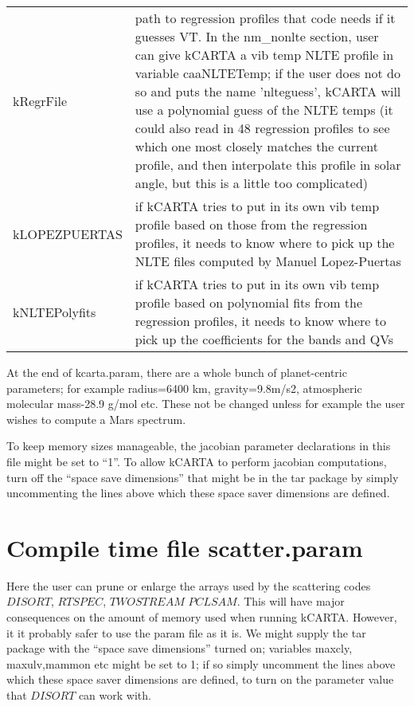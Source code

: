 \documentclass[12pt]{article}
\newcommand{\kc}{\textsf{kCARTA}\xspace}
\newlength{\colwidth}
\begin{document}
\begin{longtable}{|l|p{\colwidth}|}
kRegrFile & path to regression profiles that code needs if it guesses VT.
            In the nm\_nonlte section, user can give kCARTA a vib temp NLTE
            profile in variable caaNLTETemp; if the user does not do so and
            puts the name 'nlteguess', kCARTA will use a polynomial guess
            of the NLTE temps (it could also read in 48 regression profiles 
            to see which one most closely matches the current profile, and 
            then interpolate this profile in solar angle, but this is 
            a little too complicated)\\
kLOPEZPUERTAS & if kCARTA tries to put in its own vib temp profile based on 
               those from the regression profiles, it needs to know where to 
               pick up the NLTE files computed by Manuel Lopez-Puertas\\
kNLTEPolyfits & if kCARTA tries to put in its own vib temp profile based on 
               polynomial fits from the regression profiles, it needs to know 
               where to pick up the coefficients for the bands and QVs \\
               \hline
\end{longtable}

At the end of kcarta.param, there are a whole bunch of planet-centric parameters;
for example radius=6400 km, gravity=9.8m/s2, atmospheric molecular mass-28.9 g/mol etc. 
These not be changed unless for example the user wishes to compute a Mars spectrum.

To keep memory sizes manageable, the jacobian parameter declarations in this
file might be set to ``1''. To allow \kc to perform jacobian computations, 
turn off the ``space save dimensions'' that might be in the tar package by  
simply uncommenting the lines above which these space saver dimensions are 
defined.

\section{Compile time file {\sf scatter.param}}
Here the user can prune or enlarge the arrays used by the scattering codes 
$DISORT$, $RTSPEC$, $TWOSTREAM$ $PCLSAM$. This will have major consequences on
the amount of memory used when
running \kc. However, it it probably safer to use the param file as it is. We
might supply the tar package with the ``space save dimensions'' turned on; 
variables maxcly, maxulv,mammon etc might be set to 1; if so simply uncomment
the lines above which these space saver dimensions are defined, to turn on
the parameter value that $DISORT$ can work with.
\end{document}
